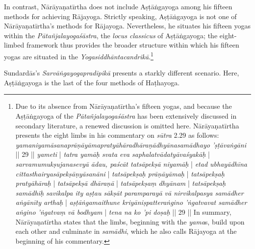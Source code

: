 In contrast, Nārāyaṇatīrtha does not include Aṣṭāṅgayoga among his fifteen methods for achieving Rājayoga. Strictly speaking, Aṣṭāṅgayoga is not one of Nārāyaṇatīrtha's methods for Rājayoga. Nevertheless, he situates his fifteen yogas within the \textit{Pātañjalayogaśāstra}, the \textit{locus classicus} of Aṣṭāṅgayoga; the eight-limbed framework thus provides the broader structure within which his fifteen yogas are situated in the \textit{Yogasiddhāntacandrikā}.\footnote{Due to its absence from Nārāyaṇatīrtha's fifteen yogas, and because the Aṣṭāṅgayoga of the \textit{Pātañjalayogaśāstra} has been extensively discussed in secondary literature, a renewed discussion is omitted here. Nārāyaṇatīrtha presents the eight limbs in his commentary on \textit{sūtra} 2.29 as follows: \textit{yamaniyamāsanaprāṇāyāmapratyāhāradhāraṇādhyānasamādhayo 'ṣṭāvaṅgāni} || 29 || \textit{yameti} | \textit{tatra yamāḥ svata eva saphalatvādatyāvaśyakāḥ} | \textit{sarvamumukṣujanasevyā ādau, paścāt tatsāpekṣā niyamāḥ} | \textit{etad ubhayādhīna cittasthairyasāpekṣāṇyāsanāni} | \textit{tatsāpekṣaḥ prāṇāyāmaḥ} | \textit{tatsāpekṣaḥ pratyāhāraḥ} | \textit{tatsāpekṣā dhāraṇā} | \textit{tatsāpekṣaṃ dhyānam} | \textit{tatsāpekṣaḥ samādhiḥ savikalpa ity aṣṭau sākṣāt paramparayā vā nirvikalpasya samādher aṅgānīty arthaḥ} | \textit{aṣṭāṅgamaithune kriyāniṣpatteraṅgino 'ṅgatvavat samādher aṅgino 'ṅgatvaṃ vā bodhyam} | \textit{tena na ko 'pi doṣaḥ} || 29 || In summary, Nārāyaṇatīrtha states that the limbs, beginning with the \textit{yama}s, build upon each other and culminate in \textit{samādhi}, which he also calls Rājayoga at the beginning of his commentary.}

Sundardās's \textit{Sarvāṅgayogapradīpikā} presents a starkly different scenario. Here, Aṣṭāṅgayoga is the last of the four methods of Haṭhayoga.

